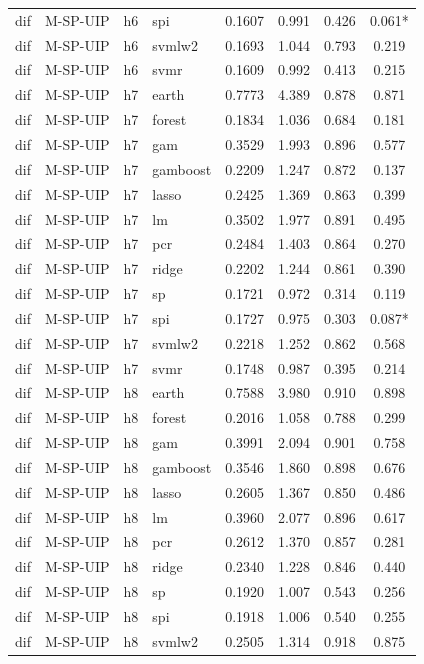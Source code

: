 \begin{ThreePartTable}
\begin{longtable}[t]{llclcccc}
dif & M-SP-UIP & h6 & spi & 0.1607 & 0.991 & 0.426 & 0.061*\\
dif & M-SP-UIP & h6 & svmlw2 & 0.1693 & 1.044 & 0.793 & 0.219\\
dif & M-SP-UIP & h6 & svmr & 0.1609 & 0.992 & 0.413 & 0.215\\
\addlinespace
dif & M-SP-UIP & h7 & earth & 0.7773 & 4.389 & 0.878 & 0.871\\
dif & M-SP-UIP & h7 & forest & 0.1834 & 1.036 & 0.684 & 0.181\\
dif & M-SP-UIP & h7 & gam & 0.3529 & 1.993 & 0.896 & 0.577\\
dif & M-SP-UIP & h7 & gamboost & 0.2209 & 1.247 & 0.872 & 0.137\\
dif & M-SP-UIP & h7 & lasso & 0.2425 & 1.369 & 0.863 & 0.399\\
dif & M-SP-UIP & h7 & lm & 0.3502 & 1.977 & 0.891 & 0.495\\
dif & M-SP-UIP & h7 & pcr & 0.2484 & 1.403 & 0.864 & 0.270\\
dif & M-SP-UIP & h7 & ridge & 0.2202 & 1.244 & 0.861 & 0.390\\
dif & M-SP-UIP & h7 & sp & 0.1721 & 0.972 & 0.314 & 0.119\\
dif & M-SP-UIP & h7 & spi & 0.1727 & 0.975 & 0.303 & 0.087*\\
dif & M-SP-UIP & h7 & svmlw2 & 0.2218 & 1.252 & 0.862 & 0.568\\
dif & M-SP-UIP & h7 & svmr & 0.1748 & 0.987 & 0.395 & 0.214\\
\addlinespace
dif & M-SP-UIP & h8 & earth & 0.7588 & 3.980 & 0.910 & 0.898\\
dif & M-SP-UIP & h8 & forest & 0.2016 & 1.058 & 0.788 & 0.299\\
dif & M-SP-UIP & h8 & gam & 0.3991 & 2.094 & 0.901 & 0.758\\
dif & M-SP-UIP & h8 & gamboost & 0.3546 & 1.860 & 0.898 & 0.676\\
dif & M-SP-UIP & h8 & lasso & 0.2605 & 1.367 & 0.850 & 0.486\\
dif & M-SP-UIP & h8 & lm & 0.3960 & 2.077 & 0.896 & 0.617\\
dif & M-SP-UIP & h8 & pcr & 0.2612 & 1.370 & 0.857 & 0.281\\
dif & M-SP-UIP & h8 & ridge & 0.2340 & 1.228 & 0.846 & 0.440\\
dif & M-SP-UIP & h8 & sp & 0.1920 & 1.007 & 0.543 & 0.256\\
dif & M-SP-UIP & h8 & spi & 0.1918 & 1.006 & 0.540 & 0.255\\
dif & M-SP-UIP & h8 & svmlw2 & 0.2505 & 1.314 & 0.918 & 0.875\\

\end{longtable}
\end{ThreePartTable}
